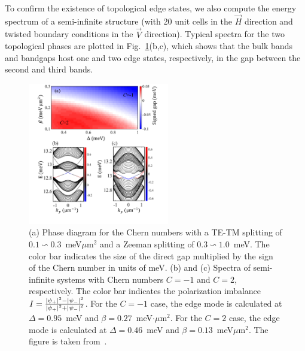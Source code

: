 To confirm the existence of topological edge states, we also compute the energy spectrum of a semi-infinite structure (with 20 unit cells in the $\vec{H}$ direction and twisted boundary conditions in the $\vec{V}$ direction).
Typical spectra for the two topological phases are plotted in Fig.~\ref{fig:Ch5_Fig2}(b,c), which shows that the bulk bands and bandgaps host one and two edge states, respectively, in the gap between the second and third bands.
%
%
%
\begin{figure}[ht]
    \centering
    \includegraphics[width=0.55\textwidth]{Fig/Ch5/Fig2.pdf}%
    \caption[Chern number phase diagram and edge states]{(a) Phase diagram for the Chern numbers with a TE-TM splitting of $0.1 \backsim 0.3$~meV$\mu$m$^2$ and a Zeeman splitting of $0.3 \backsim 1.0$~meV. The color bar indicates the size of the direct gap multiplied by the sign of the Chern number in units of meV. (b) and (c) Spectra of semi-infinite systems with Chern numbers $C = -1$ and $C = 2$, respectively. The color bar indicates the polarization imbalance $I = \frac{\abs{\psi_+}^2-\abs{\psi_-}^2}{\abs{\psi_+}^2+\abs{\psi_-}^2}$. For the $C=-1$ case, the edge mode is calculated at $\Delta=0.95$~meV and $\beta=0.27$~meV$\cdot\mu$m$^2$. For the $C=2$ case, the edge mode is calculated at $\Delta=0.46$~meV and $\beta=0.13$~meV$\mu$m$^2$. The figure is taken from~\cite{Sun:2019ab}.}
    \label{fig:Ch5_Fig2}
\end{figure}
%
%
%

